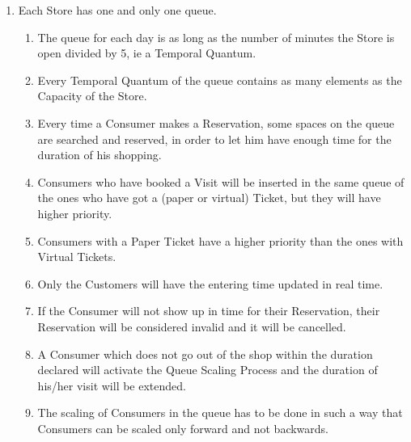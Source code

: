 \documentclass[a4paper, 12pt, oneside]{article}
\begin{document}
\begin{enumerate}[align=left, label={R.\arabic{*}}]
    
    \item \label{req:queueUnique}Each Store has one and only one queue.
    \begin{enumerate}[label={-}]
        \item \label{req:codeUnique:queueVector} The queue for each day is as long as the number of minutes the Store is open divided by 5, ie a Temporal Quantum.
        \item \label{req:codeUnique:vectorOfVectors} Every Temporal Quantum of the queue contains as many elements as the Capacity of the Store.
        \item \label{req:codeUnique:queueReservations}Every time a Consumer makes a Reservation, some spaces on the queue are searched and reserved, in order to let him have enough time for the duration of his shopping.
        \item \label{req:codeUnique:visitsAndQueue} Consumers who have booked a Visit will be inserted in the same queue of the ones who have got a (paper or virtual) Ticket, but they will have higher priority.
        \item \label{req:codeUnique:ticketsAndQueue} Consumers with a Paper Ticket have a higher priority than the ones with Virtual Tickets.
        \item Only the Customers will have the entering time updated in real time. %
        \item \label{req:codeUnique:invalidateLate} If the Consumer will not show up in time for their Reservation, %
        their Reservation will be considered invalid and it will be cancelled.
        \item \label{req:codeUnique:exeedDuration} A Consumer which does not go out of the shop within the duration declared will activate the Queue Scaling Process and the duration of his/her visit will be extended.%
        \item \label{req:codeUnique:queueScaling} The scaling of Consumers in the queue has to be done in such a way that Consumers can be scaled only forward and not backwards. %

\end{enumerate}
\end{enumerate}
\end{document}
